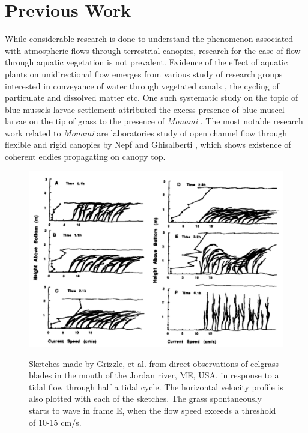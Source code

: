 \documentclass[12pt]{report}   %
\newcommand{\monami}{\textit{monami}}
\begin{document}
\section{Previous Work}
While considerable research is done to understand the phenomenon associated with atmospheric flows through terrestrial canopies, research for the case of flow through aquatic vegetation is not prevalent. Evidence of the effect of aquatic plants on unidirectional flow emerges from various study of research groups interested in conveyance of water through vegetated canals \cite{kouwen93}, the cycling of particulate and dissolved matter etc. One such systematic study on the topic of blue mussels larvae settlement attributed the excess presence of blue-muscel larvae on the tip of grass to the presence of \textit{Monami} \cite{Grizzle96}. The most notable research work related to \textit{Monami} are laboratories study of open channel flow through flexible and rigid canopies by Nepf and Ghisalberti \cite{Ikeda96,Ghisal02}, which shows existence of coherent eddies propagating on canopy top. 
\begin{figure}
 {\includegraphics[scale=0.72]{Grizzle}}
 \caption[Experimental observation of \monami]{Sketches made by Grizzle, et al. \citep{Grizzle96} from direct observations of eelgrass blades in the mouth of the Jordan river, ME, USA, in response to a tidal
 flow through half a tidal cycle. The horizontal velocity profile is also plotted with each of the sketches. The grass spontaneously starts to wave in frame E, when the flow 
 speed exceeds a threshold of 10-15 cm/s.}
 \label{GrizzleFig}
\end{figure}
\end{document}
